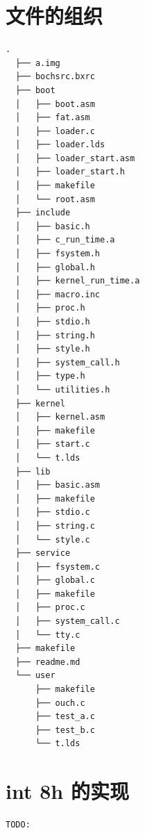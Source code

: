 \documentclass[forprint]{WHUBachelor}
\begin{document}


% 





\appendix

\chapter{文件的组织}
\label{code:organization}
\begin{lstlisting}[language={[x86masm]Assembler}]
  .
  ├── a.img
  ├── bochsrc.bxrc
  ├── boot
  │   ├── boot.asm
  │   ├── fat.asm
  │   ├── loader.c
  │   ├── loader.lds
  │   ├── loader_start.asm
  │   ├── loader_start.h
  │   ├── makefile
  │   └── root.asm
  ├── include
  │   ├── basic.h
  │   ├── c_run_time.a
  │   ├── fsystem.h
  │   ├── global.h
  │   ├── kernel_run_time.a
  │   ├── macro.inc
  │   ├── proc.h
  │   ├── stdio.h
  │   ├── string.h
  │   ├── style.h
  │   ├── system_call.h
  │   ├── type.h
  │   └── utilities.h
  ├── kernel
  │   ├── kernel.asm
  │   ├── makefile
  │   ├── start.c
  │   └── t.lds
  ├── lib
  │   ├── basic.asm
  │   ├── makefile
  │   ├── stdio.c
  │   ├── string.c
  │   └── style.c
  ├── service
  │   ├── fsystem.c
  │   ├── global.c
  │   ├── makefile
  │   ├── proc.c
  │   ├── system_call.c
  │   └── tty.c
  ├── makefile
  ├── readme.md
  └── user
      ├── makefile
      ├── ouch.c
      ├── test_a.c
      ├── test_b.c
      └── t.lds
\end{lstlisting}

\chapter{int 8h 的实现}

\label{code:int_8h}
\begin{lstlisting}[language={[x86masm]Assembler}] 
TODO:
\end{lstlisting}


\cleardoublepage
\end{document}

